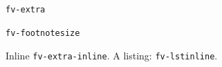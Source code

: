 \documentclass{article}
\begin{document}
\begin{Verbatim}[breaklines]
fv-extra
\end{Verbatim}
\begin{Verbatim}[fontsize=\footnotesize]
fv-footnotesize
\end{Verbatim}
Inline \Verb|fv-extra-inline|.
A listing: \lstinline|fv-lstinline|.
\end{document}
